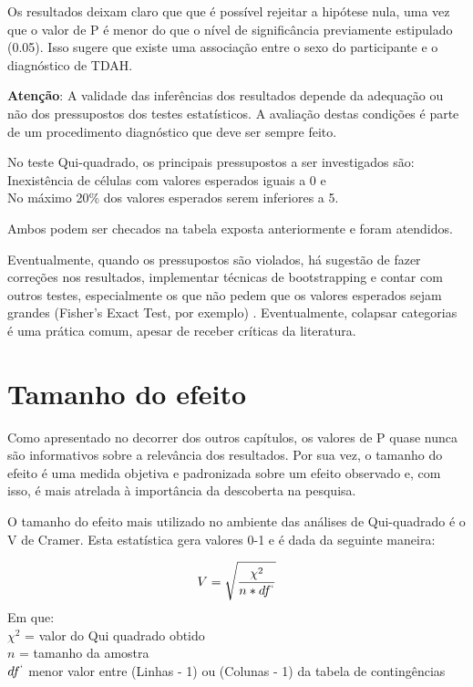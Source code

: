 \documentclass[
]{book}
\newenvironment{warning}{
  \definecolor{shadecolor}{rgb}{0, 0, 0}  %
  \color{white}
  \begin{shaded}}
 {\end{shaded}}
\begin{document}
Os resultados deixam claro que que é possível rejeitar a hipótese nula, uma vez que o valor de P é menor do que o nível de significância previamente estipulado (0.05). Isso sugere que existe uma associação entre o sexo do participante e o diagnóstico de TDAH.

\begin{warning}

\textbf{Atenção}: A validade das inferências dos resultados depende da adequação ou não dos pressupostos dos testes estatísticos. A avaliação destas condições é parte de um procedimento diagnóstico que deve ser sempre feito.

\end{warning}

No teste Qui-quadrado, os principais pressupostos a ser investigados são:\\
Inexistência de células com valores esperados iguais a 0 e\\
No máximo 20\% dos valores esperados serem inferiores a 5.

Ambos podem ser checados na tabela exposta anteriormente e foram atendidos.

Eventualmente, quando os pressupostos são violados, há sugestão de fazer correções nos resultados, implementar técnicas de bootstrapping e contar com outros testes, especialmente os que não pedem que os valores esperados sejam grandes (Fisher's Exact Test, por exemplo) \citep{Campbell2007}. Eventualmente, colapsar categorias é uma prática comum, apesar de receber críticas da literatura.

\hypertarget{tamanho-do-efeito}{%
\section{Tamanho do efeito}\label{tamanho-do-efeito}}

Como apresentado no decorrer dos outros capítulos, os valores de P quase nunca são informativos sobre a relevância dos resultados. Por sua vez, o tamanho do efeito é uma medida objetiva e padronizada sobre um efeito observado e, com isso, é mais atrelada à importância da descoberta na pesquisa.

O tamanho do efeito mais utilizado no ambiente das análises de Qui-quadrado é o V de Cramer. Esta estatística gera valores 0-1 e é dada da seguinte maneira:

\[V=\sqrt\frac{\chi^2}{n*df^`}\]
Em que:\\
\(\chi^2\) = valor do Qui quadrado obtido\\
\(n\) = tamanho da amostra\\
\(df^`\) menor valor entre (Linhas - 1) ou (Colunas - 1) da tabela de contingências
\end{document}

